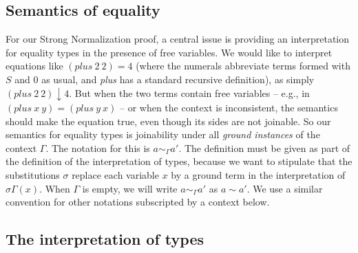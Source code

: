 \documentclass[copyright]{eptcs}
\begin{document}
\subsection{Semantics of equality}

For our Strong Normalization proof, a central issue is providing an
interpretation for equality types in the presence of free variables.
We would like to interpret equations like $(\textit{plus}\ 2\ 2) = 4$
(where the numerals abbreviate terms formed with $S$ and $0$ as usual,
and \textit{plus} has a standard recursive definition), as simply
$(\textit{plus}\ 2\ 2) \downarrow 4$.  But when the two terms contain
free variables -- e.g., in $(\textit{plus}\ x\ y) =
(\textit{plus}\ y\ x)$ -- or when the context is inconsistent, the
semantics should make the equation true, even though its sides are not
joinable.  So our semantics for equality types is joinability under
all \emph{ground instances} of the context $\Gamma$.  The notation for
this is $a \sim_\Gamma a'$.  The definition must be given as part of
the definition of the interpretation of types, because we want to
stipulate that the substitutions $\sigma$ replace each variable $x$ by
a ground term in the interpretation of $\sigma \Gamma(x)$.  When
$\Gamma$ is empty, we will write $a\sim_\Gamma a'$ as $a\sim a'$.  We
use a similar convention for other notations subscripted by a context
below.

\subsection{The interpretation of types}
\end{document}
